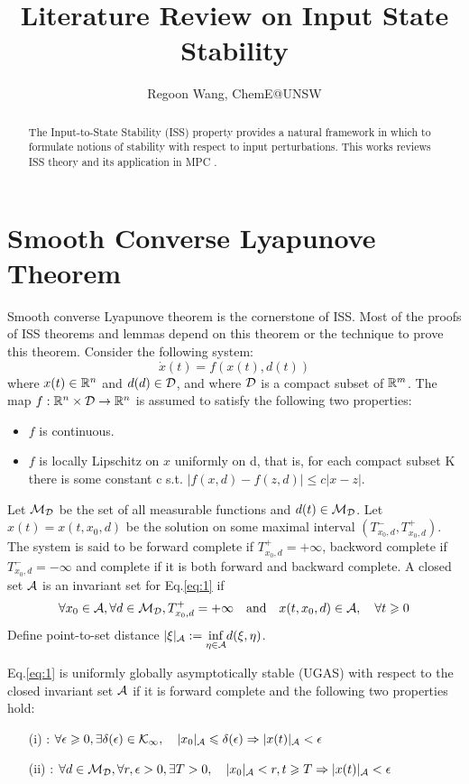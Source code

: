 \documentclass{paper}
\begin{document}
 
\title{Literature Review on Input State Stability}
\author{Regoon Wang, ChemE@UNSW} 

\maketitle
\begin{abstract}
The Input-to-State Stability (ISS) property provides a natural framework in which to formulate notions
of stability with respect to input perturbations. This works reviews ISS theory \cite{iss:1,iss:2,iss:3,iss:4} 
and its application in MPC \cite{iss:5,iss:6}. 
\end{abstract} 

\tableofcontents
\section{Smooth Converse Lyapunove Theorem}
Smooth converse Lyapunove theorem is the cornerstone of ISS. Most of the proofs of ISS theorems and lemmas depend 
on this theorem or the technique to prove this theorem. Consider the following system:
\begin{equation}\label{eq:1}
\dot{x}(t)=f(x(t),d(t))
\end{equation}
where $x(t)\in\mathbb{R}^{n}$ and $d(d)\in\mathcal{D}$, and where $\mathcal{D}$ is a compact subset of $\mathbb{R}^{m}$. The map ${f}:{\mathbb{R}^{n}\times\mathcal{D}}\rightarrow{\mathbb{R}^{n}}$ is assumed to satisfy the following two properties:
\begin{itemize}
\item $f$ is continuous.
\item $f$ is locally Lipschitz on $x$ uniformly on d, that is, for each compact subset K there is some constant c
s.t. $|f(x,d)-f(z,d)|\leqslant c|x-z|$.
\end{itemize}
Let $\mathcal{M}_\mathcal{D}$ be the set of all measurable functions and $d(t)\in\mathcal{M}_\mathcal{D}$. Let $x(t)=x(t,x_0,d)$ be the solution on some
maximal interval $\left(T_{x_0,d}^-,T_{x_0,d}^+\right)$. The system is said to be forward complete if $T_{x_0,d}^+=+\infty$,
backword complete if $T_{x_0,d}^-=-\infty$ and complete if it is both forward and backward complete. A closed set 
$\mathcal{A} $ is an invariant set for Eq.\ref{eq:1} if
\begin{equation*}
\forall x_0\in\mathcal{A},\forall d\in\mathcal{M}_\mathcal{D},T_{x_0,d}^+=+\infty\quad \text{and}\quad x(t,x_0,d)\in\mathcal{A},\quad\forall t\geqslant 0
\end{equation*}
Define point-to-set distance $|\xi|_{\mathcal{A}}:=\underset{\eta\in\mathcal{A}}{\inf}d(\xi,\eta)$.
\begin{defi}
Eq.\ref{eq:1} is uniformly globally asymptotically stable (UGAS) with respect to the closed invariant set $\mathcal{A}$ if 
it is forward complete and the following two properties hold:
\begin{enumerate}
\item[(i)] : $\forall\epsilon\geqslant 0,\exists \delta(\epsilon)\in\mathcal{K}_\infty,\quad |x_0|_{\mathcal{A}}\leqslant
\delta(\epsilon)\Rightarrow |x(t)|_{\mathcal{A}}<\epsilon$
\item[(ii)] : $\forall d\in\mathcal{M}_\mathcal{D}, \forall r,\epsilon>0,\exists T>0,\quad |x_0|_{\mathcal{A}}<r,t\geqslant 
T\Rightarrow |x(t)|_{\mathcal{A}}<\epsilon$
\end{enumerate}
\end{defi}
\end{document}
